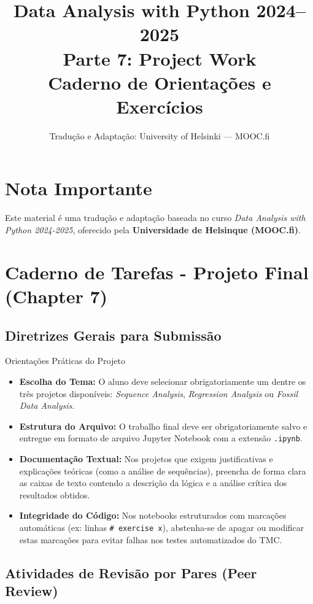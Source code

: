 \documentclass[11pt,a4paper]{article}
\title{\textbf{Data Analysis with Python 2024--2025}\\Parte 7: Project Work\\\large Caderno de Orientações e Exercícios}
\author{Tradução e Adaptação: University of Helsinki --- MOOC.fi}
\date{}
\begin{document}
\maketitle

\section*{Nota Importante}
Este material é uma tradução e adaptação baseada no curso \textit{Data Analysis with Python 2024-2025}, oferecido pela \textbf{Universidade de Helsinque (MOOC.fi)}.

\tableofcontents
\newpage

\section{Caderno de Tarefas - Projeto Final (Chapter 7)}

\subsection*{Diretrizes Gerais para Submissão}

\begin{exercicio}{Orientações Práticas do Projeto}
\begin{itemize}
    \item \textbf{Escolha do Tema:} O aluno deve selecionar obrigatoriamente um dentre os três projetos disponíveis: \emph{Sequence Analysis}, \emph{Regression Analysis} ou \emph{Fossil Data Analysis}.
    \item \textbf{Estrutura do Arquivo:} O trabalho final deve ser obrigatoriamente salvo e entregue em formato de arquivo Jupyter Notebook com a extensão \texttt{.ipynb}.
    \item \textbf{Documentação Textual:} Nos projetos que exigem justificativas e explicações teóricas (como a análise de sequências), preencha de forma clara as caixas de texto contendo a descrição da lógica e a análise crítica dos resultados obtidos.
    \item \textbf{Integridade do Código:} Nos notebooks estruturados com marcações automáticas (ex: linhas \texttt{\# exercise x}), abstenha-se de apagar ou modificar estas marcações para evitar falhas nos testes automatizados do TMC.
\end{itemize}
\end{exercicio}

\subsection*{Atividades de Revisão por Pares (Peer Review)}
\end{document}
